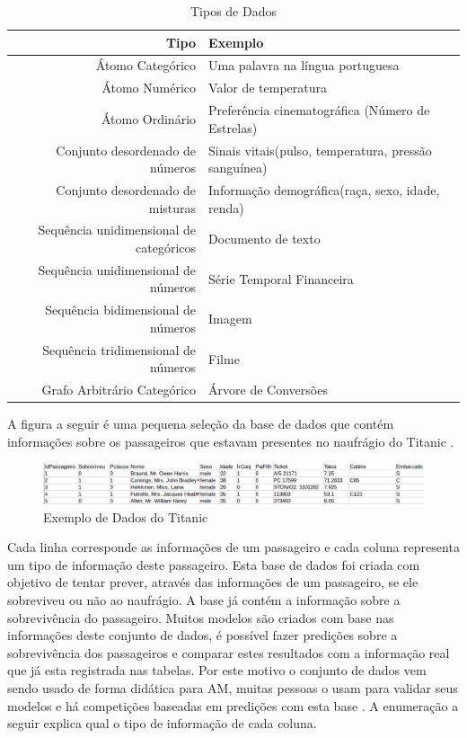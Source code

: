 \begin{table}[h]
\centering
\caption{Tipos de Dados}
\vspace{0.5cm}
\begin{tabular}{r|lr}

\hline 
Tipo & Exemplo  \\ %
\hline                               %
Átomo Categórico        & Uma palavra na língua portuguesa \\
\hline   
Átomo Numérico & Valor de temperatura \\
\hline 
Átomo Ordinário           & Preferência cinematográfica (Número de Estrelas) \\
\hline 
Conjunto desordenado de números       & Sinais vitais(pulso, temperatura, pressão sanguínea)\\
\hline 
Conjunto desordenado de misturas     & Informação demográfica(raça, sexo, idade, renda)\\
\hline 
Sequência unidimensional de categóricos       & Documento de texto\\
\hline 
Sequência unidimensional de números       & Série Temporal Financeira\\
\hline 
Sequência bidimensional de números      & Imagem\\
\hline 
Sequência tridimensional de números       & Filme\\
\hline 
Grafo Arbitrário Categórico       & Árvore de Conversões\\
 \hline 
\end{tabular}
\end{table}

A figura a seguir é uma pequena seleção da base de dados que contém informações sobre os passageiros que estavam presentes no naufrágio do Titanic \cite{titanic2012}. 

\begin{figure}[!h]
\centering
\includegraphics[keepaspectratio=true,scale=0.40]
{figuras/dataEg.eps}
\caption{Exemplo de Dados do Titanic}
\label{data_titatic}
\end{figure}

Cada linha corresponde as informações de um passageiro e cada coluna representa um tipo de informação deste passageiro. Esta base de dados foi criada com objetivo de tentar prever, através das informações de um passageiro, se ele sobreviveu ou não ao naufrágio. A base já contém a informação sobre a sobrevivência do passageiro. Muitos modelos são criados com base nas informações deste conjunto de dados, é possível fazer predições sobre a sobrevivência dos passageiros e comparar estes resultados com a informação real que já esta registrada nas tabelas. Por este motivo o conjunto de dados vem sendo usado de forma didática para AM, muitas pessoas o usam para validar seus modelos e há competições baseadas em predições com esta base \cite{titanic2011}. A enumeração a seguir explica qual o tipo de informação de cada coluna. 

